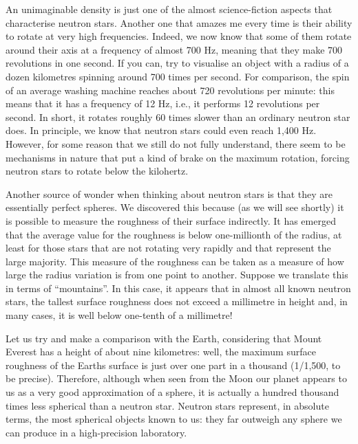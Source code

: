 An unimaginable density is just one of the almost science-fiction aspects that
characterise neutron stars. Another one that amazes me every time is their ability to
rotate at very high frequencies. Indeed, we now know that some of them rotate around
their axis at a frequency of almost 700 Hz, meaning that they make 700 revolutions in
one second. If you can, try to visualise an object with a radius of a dozen kilometres
spinning around 700 times per second. For comparison, the spin of an average washing
machine reaches about 720 revolutions per minute: this means that it has a frequency of
12 Hz, i.e., it performs 12 revolutions per second. In short, it rotates roughly 60
times slower than an ordinary neutron star does.
In principle, we know that neutron stars could even reach 1,400 Hz. However, for some
reason that we still do not fully understand, there seem to be mechanisms in nature that
put a kind of brake on the maximum rotation, forcing neutron stars to rotate below the
kilohertz.

Another source of wonder when thinking about neutron stars is that they are essentially
perfect spheres. We discovered this because (as we will see shortly) it is possible to
measure the roughness of their surface indirectly. It has emerged that the average value
for the roughness is below one-millionth of the radius, at least for those stars that
are not rotating very rapidly and that represent the large majority. This measure of the
roughness can be taken as a measure of how large the radius variation is from one point
to another. Suppose we translate this in terms of ``mountains''. In this case, it
appears that in almost all known neutron stars, the tallest surface roughness does not
exceed a millimetre in height and, in many cases, it is well below one-tenth of a
millimetre!

Let us try and make a comparison with the Earth, considering that Mount Everest has a
height of about nine kilometres: well, the maximum surface roughness of the
Earth\textquotesingle s surface is just over one part in a thousand (1/1,500, to be
precise). Therefore, although when seen from the Moon our planet
appears to us as a very good approximation of a sphere, it is actually a hundred
thousand times less spherical than a neutron star. Neutron stars represent, in absolute
terms, the most spherical objects known to us: they far outweigh any sphere we can
produce in a high-precision laboratory.

